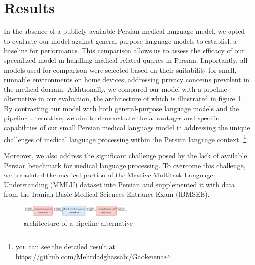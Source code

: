 \documentclass[conference]{IEEEtran}
\begin{document}
\section{Results}
In the absence of a publicly available Persian medical language model, we opted to evaluate our model against general-purpose language models to establish a baseline for performance. This comparison allows us to assess the efficacy of our specialized model in handling medical-related queries in Persian. Importantly, all models used for comparison were selected based on their suitability for small, runnable environments on home devices, addressing privacy concerns prevalent in the medical domain. Additionally, we compared our model with a pipeline alternative in our evaluation, the architecture of which is illustrated in figure \ref{fig3}. By contrasting our model with both general-purpose language models and the pipeline alternative, we aim to demonstrate the advantages and specific capabilities of our small Persian medical language model in addressing the unique challenges of medical language processing within the Persian language context.
\footnote{
	you can see the detailed result at https://github.com/Mehrdadghassabi/Gaokerena
}

Moreover, we also address the significant challenge posed by the lack of available Persian benchmark for medical language processing. To overcome this challenge, we translated the medical portion of the Massive Multitask Language Understanding (MMLU) dataset 
\cite{b29} 
into Persian and supplemented it with data from the Iranian Basic Medical Sciences Entrance Exam (IBMSEE).

\begin{figure}[htbp]
	\centerline{\includegraphics[width=0.5\textwidth]{fig3.png}}
	\caption{architecture of a pipeline alternative}
	\label{fig3}
\end{figure}
\end{document}
